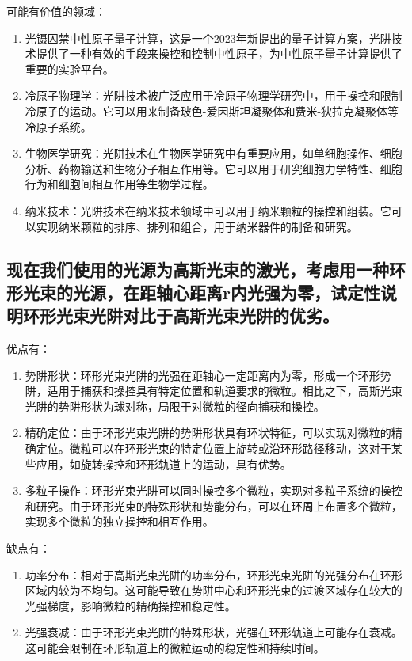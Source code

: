 \documentclass[a4paper,UTF8]{ctexart}
\begin{document}
可能有价值的领域：

\begin{enumerate}
    \item 光镊囚禁中性原子量子计算，这是一个2023年新提出的量子计算方案，光阱技术提供了一种有效的手段来操控和控制中性原子，为中性原子量子计算提供了重要的实验平台。
    \item 冷原子物理学：光阱技术被广泛应用于冷原子物理学研究中，用于操控和限制冷原子的运动。它可以用来制备玻色-爱因斯坦凝聚体和费米-狄拉克凝聚体等冷原子系统。
    \item 生物医学研究：光阱技术在生物医学研究中有重要应用，如单细胞操作、细胞分析、药物输送和生物分子相互作用等。它可以用于研究细胞力学特性、细胞行为和细胞间相互作用等生物学过程。
    \item 纳米技术：光阱技术在纳米技术领域中可以用于纳米颗粒的操控和组装。它可以实现纳米颗粒的排序、排列和组合，用于纳米器件的制备和研究。
\end{enumerate}

\subsection{现在我们使用的光源为高斯光束的激光，考虑用一种环形光束的光源，在距轴心距离r内光强为零，试定性说明环形光束光阱对比于高斯光束光阱的优劣。}

优点有：

\begin{enumerate}
    \item 势阱形状：环形光束光阱的光强在距轴心一定距离内为零，形成一个环形势阱，适用于捕获和操控具有特定位置和轨道要求的微粒。相比之下，高斯光束光阱的势阱形状为球对称，局限于对微粒的径向捕获和操控。
    \item 精确定位：由于环形光束光阱的势阱形状具有环状特征，可以实现对微粒的精确定位。微粒可以在环形光束的特定位置上旋转或沿环形路径移动，这对于某些应用，如旋转操控和环形轨道上的运动，具有优势。
    \item 多粒子操作：环形光束光阱可以同时操控多个微粒，实现对多粒子系统的操控和研究。由于环形光束的特殊形状和势能分布，可以在环周上布置多个微粒，实现多个微粒的独立操控和相互作用。
\end{enumerate}

缺点有：

\begin{enumerate}
    \item 功率分布：相对于高斯光束光阱的功率分布，环形光束光阱的光强分布在环形区域内较为不均匀。这可能导致在势阱中心和环形光束的过渡区域存在较大的光强梯度，影响微粒的精确操控和稳定性。
    \item 光强衰减：由于环形光束光阱的特殊形状，光强在环形轨道上可能存在衰减。这可能会限制在环形轨道上的微粒运动的稳定性和持续时间。
\end{enumerate}
\end{document}
